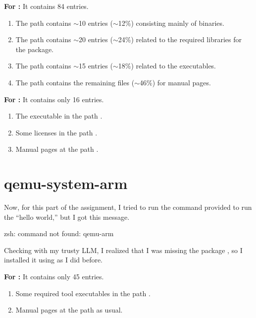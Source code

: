 \textbf{For :} It contains 84 entries.
\begin{enumerate}
    \item The path  contains \(\sim\)10 entries (\(\sim\)12\%) consisting mainly of binaries.
    \item The path  contains \(\sim\)20 entries (\(\sim\)24\%) related to the required libraries for the package.
    \item The path  contains \(\sim\)15 entries (\(\sim\)18\%) related to the executables.
    \item The path  contains the remaining files (\(\sim\)46\%) for manual pages.
\end{enumerate}

\textbf{For :} It contains only 16 entries.
\begin{enumerate}
    \item The executable in the path .
    \item Some licenses in the path .
    \item Manual pages at the path .
\end{enumerate}

\section{qemu-system-arm}
Now, for this part of the assignment, I tried to run the command provided to run the ``hello world,'' but I got this message.

\begin{terminal}
zsh: command not found: qemu-arm
\end{terminal}

Checking with my trusty LLM, I realized that I was missing the package , so I installed it using  as I did before.

\begin{terminal}
\end{terminal}

\textbf{For :} It contains only 45 entries.
\begin{enumerate}
    \item Some required tool executables in the path .
    \item Manual pages at the path  as usual.
\end{enumerate}


